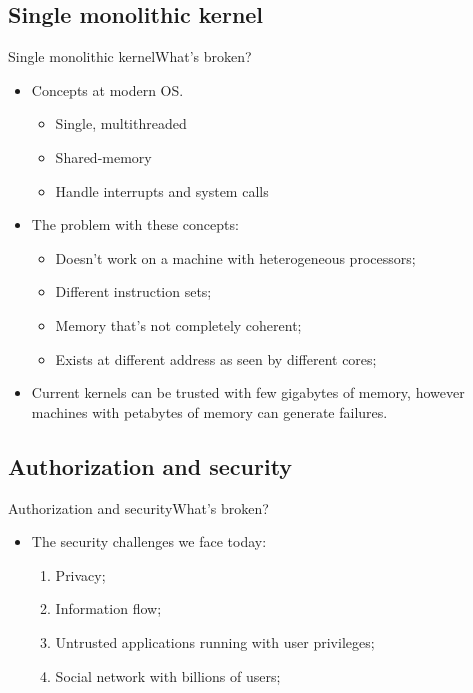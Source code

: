 \documentclass[10pt]{beamer}
\begin{document}
\subsection{Single monolithic kernel}
\begin{frame}{Single monolithic kernel}{What's broken?}
  \begin{itemize}
    \item Concepts at modern OS.
      \begin{itemize}
        \item Single, multithreaded
        \item Shared-memory
        \item Handle interrupts and system calls
      \end{itemize}
    \item The problem with these concepts:
      \begin{itemize}
        \item Doesn't work on a machine with heterogeneous processors;
        \item Different instruction sets;
        \item Memory that's not completely coherent;
        \item Exists at different address as seen by different cores;
      \end{itemize}
    \item Current kernels can be trusted with few gigabytes of memory, however
          machines with petabytes of memory can generate failures.
  \end{itemize}
\end{frame}

\subsection{Authorization and security}
\begin{frame}{Authorization and security}{What's broken?}
  \begin{itemize}
    \item The security challenges we face today:
    \begin{enumerate}
      \item Privacy;
      \item Information flow;
      \item Untrusted applications running with user privileges;
      \item Social network with billions of users;
    \end{enumerate}
  \end{itemize}
\end{frame}
\end{document}
